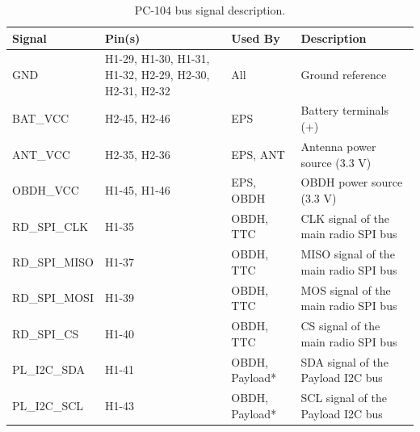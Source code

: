 \begin{table}[!h]
    \centering
    \begin{tabular}{lL{0.2\textwidth}L{0.15\textwidth}L{0.35\textwidth}}
        \toprule[1.5pt]
        \textbf{Signal} & \textbf{Pin(s)} & \textbf{Used By}     & \textbf{Description} \\
        \midrule
        GND             & H1-29, H1-30, H1-31, H1-32, H2-29, H2-30, H2-31, H2-32 & All                  & Ground reference \\
        BAT\_VCC        & H2-45, H2-46    & EPS                  & Battery terminals (+) \\
        ANT\_VCC        & H2-35, H2-36    & EPS, ANT             & Antenna power source (3.3 V) \\
        OBDH\_VCC       & H1-45, H1-46    & EPS, OBDH            & OBDH power source (3.3 V) \\
        RD\_SPI\_CLK    & H1-35           & OBDH, TTC            & CLK signal of the main radio SPI bus \\
        RD\_SPI\_MISO   & H1-37           & OBDH, TTC            & MISO signal of the main radio SPI bus \\
        RD\_SPI\_MOSI   & H1-39           & OBDH, TTC            & MOS signal of the main radio SPI bus \\
        RD\_SPI\_CS     & H1-40           & OBDH, TTC            & CS signal of the main radio SPI bus \\
        PL\_I2C\_SDA    & H1-41           & OBDH, Payload*       & SDA signal of the Payload I2C bus \\
        PL\_I2C\_SCL    & H1-43           & OBDH, Payload*       & SCL signal of the Payload I2C bus \\
        \bottomrule[1.5pt]
    \end{tabular}
    \caption{PC-104 bus signal description.}
    \label{tab:pc104-signals}
\end{table}
